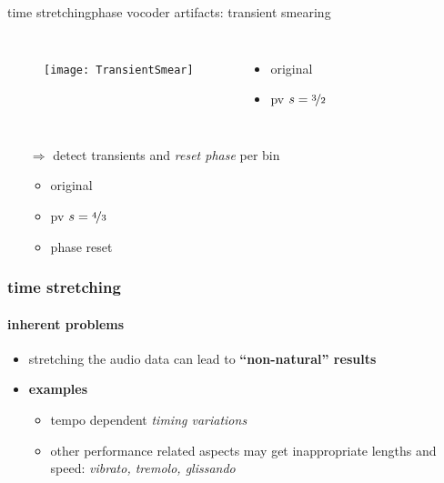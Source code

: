     \begin{frame}{time stretching}{phase vocoder artifacts: transient smearing}
        \vspace{-8mm}
        \begin{columns}
            \vspace{-3mm}
                \begin{figure}
                    \texttt{[image: TransientSmear]}
                \end{figure}

                \begin{itemize}
                \vspace{10mm}
                    \item   {}\; original  
                    \item   {}\; pv $s = \nicefrac{3}{2}$ 
                \end{itemize}
        \end{columns}
        \pause
        \vspace{-3mm}
        \begin{itemize}
            \item[$\Rightarrow$] detect transients and \textit{reset phase} per bin
                \begin{itemize}
                    \item   {}\; original  
                    \item   {}\; pv $s = \nicefrac{4}{3}$ 
                    \item   {}\; phase reset 
                \end{itemize}
        \end{itemize}
    \end{frame}

\begin{frame}\frametitle{time stretching}\framesubtitle{inherent problems}
	\begin{itemize}
		\item	stretching the audio data can lead to \textbf{``non-natural'' results}
		\pause
        \bigskip
		\item	\textbf{examples}
			\begin{itemize}
				\item tempo dependent \textit{timing variations }
				\pause
				\item	other performance related aspects may get inappropriate lengths and speed: \textit{vibrato, tremolo, glissando}
			\end{itemize}
	\end{itemize}
\end{frame}

